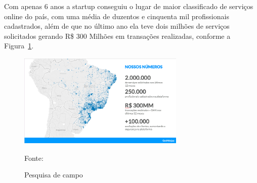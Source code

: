 Com apenas 6 anos a startup conseguiu o lugar de maior classificado de serviços online do país, com uma média de duzentos e cinquenta mil profissionais cadastrados, além de que no último ano ela teve dois milhões de serviços solicitados gerando R\$ 300 Milhões em transações realizadas, conforme a Figura~\hypersetup{linkcolor=black}\ref{fig:Pesquisa}.

\begin{figure}[!h]
	\centering
	
	\caption{Pesquisa de campo}
	\includegraphics[width=300px, height=170px]{./images/getNinjasMobile.png}
	\label{fig:Pesquisa}
	\par {Fonte: \cite{get-ninjasMobile}}
\end{figure}



